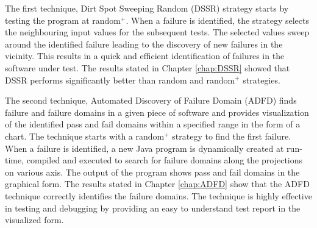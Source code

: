 






The first technique, Dirt Spot Sweeping Random (DSSR) strategy starts by testing the program at random$^+$. When a failure is identified, the strategy selects the neighbouring input values for the subsequent tests. The selected values sweep around the identified failure leading to the discovery of new failures in the vicinity. This results in a quick and efficient identification of failures in the software under test. The results stated in Chapter \ref{chap:DSSR} showed that DSSR performs significantly better than random and random$^+$ strategies.

The second technique, Automated Discovery of Failure Domain (ADFD) finds failure and failure domains in a given piece of software and provides visualization of the identified pass and fail domains within a specified range in the form of a chart. The technique starts with a random$^+$ strategy to find the first failure. When a failure is identified, a new Java program is dynamically created at run-time, compiled and executed to search for failure domains along the projections on various axis. The output of the program shows pass and fail domains in the graphical form. The results stated in Chapter \ref{chap:ADFD} show that the ADFD technique correctly identifies the failure domains. The technique is highly effective in testing and debugging by providing an easy to understand test report in the visualized form. 

